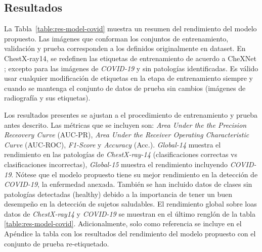 {\begin{enumerate}
\end{enumerate}


\subsection{Resultados}

La Tabla~\ref{table:res-model-covid} muestra un resumen del rendimiento del modelo propuesto. Las imágenes
que conforman los conjuntos de entrenamiento, validación y prueba corresponden a los definidos
originalmente en dataset. En ChestX-ray14, se redefinen las etiquetas de entrenamiento de acuerdo a
CheXNet \cite{rajpurkar2018deep}; excepto para las imágenes de \textit{COVID-19} y sin patologías
identificadas. Es válido usar cualquier modificación de etiquetas en la etapa de entrenamiento
siempre y cuando se mantenga el conjunto de datos de prueba sin cambios (imágenes de radiografía y
sus etiquetas).

Los resultados presentes se ajustan a el procedimiento de entrenamiento y prueba antes descrito. Las
métricas que se incluyen son: \textit{Area Under the the Precision Receovery Curve} (AUC-PR),
\textit{Area Under the Receiver Operating Characteristic Curve} (AUC-ROC), \textit{F1-Score} y
\textit{Accuracy} (Acc.). \textit{Global-14} muestra el rendimiento en las patologías de
\textit{ChestX-ray-14} (clasificaciones correctas vs clasificaciones incorrectas), \textit{Global-15}
muestra el rendimiento incluyendo \textit{COVID-19}. Nótese que el modelo propuesto tiene su mejor
rendimiento en la detección de \textit{COVID-19}, la enfermedad anexada. También se han incluido
datos de clases sin patologías detectadas (healthy) debido a la importancia de tener un buen desempeño
en la detección de sujetos saludables. El rendimiento global sobre loas datos de \textit{ChestX-ray14}
y \textit{COVID-19} se muestran en el último renglón de la tabla \ref{table:res-model-covid}. Adicionalmente,
solo como referencia se incluye en el Apéndice la tabla con los resultados del rendimiento del modelo
propuesto con el conjunto de prueba re-etiquetado.

}
